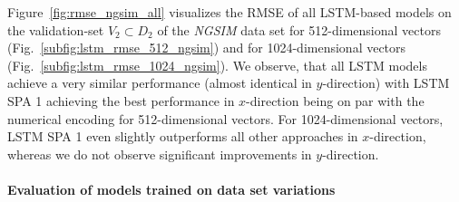 Figure~\ref{fig:rmse_ngsim_all} visualizes the \ac{RMSE} of all \ac{LSTM}-based models on the validation-set $V_2 \subset D_2$ of the \emph{\ac{NGSIM}} data set for \num{512}-dimensional vectors (Fig.~\ref{subfig:lstm_rmse_512_ngsim}) and for \num{1024}-dimensional vectors (Fig.~\ref{subfig:lstm_rmse_1024_ngsim}).
We observe, that all \ac{LSTM} models achieve a very similar performance (almost identical in $y$-direction) with \ac{LSTM} \ac{SPA} \num{1} achieving the best performance in $x$-direction being on par with the numerical encoding for \num{512}-dimensional vectors.
For \num{1024}-dimensional vectors, \ac{LSTM} \ac{SPA} \num{1} even slightly outperforms all other approaches in $x$-direction, whereas we do not observe significant improvements in $y$-direction.

\paragraph{Evaluation of models trained on data set variations}%
\label{par:evaluation_of_models_trained_on_data_set_variations}

